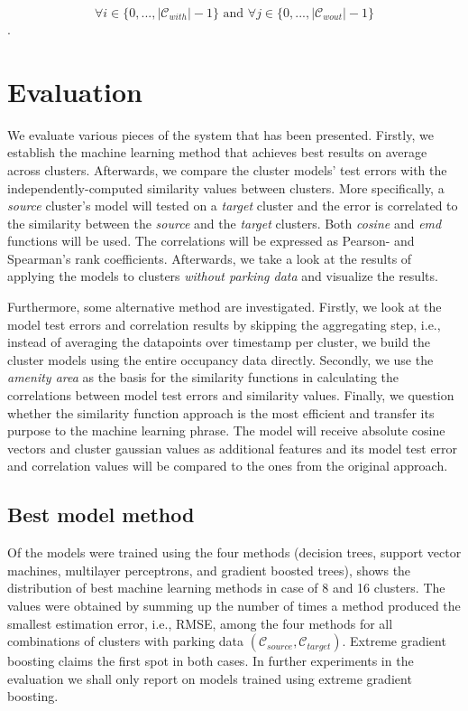 	$$\forall i \in \{0,...,|\mathcal{C}_{with}|-1\} \text{ and } \forall j \in \{0,...,|\mathcal{C}_{wout}|-1\}$$.
		
	\section{Evaluation}
	We evaluate various pieces of the system that has been presented. Firstly, we  establish the machine learning method that achieves best results on average across clusters. Afterwards, we compare the cluster models' test errors with the independently-computed similarity values between clusters. More specifically, a \textit{source} cluster's model will tested on a \textit{target} cluster and the error is correlated to the similarity between the \textit{source} and the \textit{target} clusters. Both \textit{cosine} and \textit{emd} functions will be used. The correlations will be expressed as Pearson- and Spearman's rank coefficients. Afterwards, we take a look at the results of applying the models to clusters \textit{without parking data} and visualize the results. 
	
	Furthermore, some alternative method are investigated. Firstly, we look at the model test errors and correlation results by skipping the aggregating step, i.e., instead of averaging the datapoints over timestamp per cluster, we build the cluster models using the entire occupancy data directly. Secondly, we use the \textit{amenity area} as the basis for the similarity functions in calculating the correlations between model test errors and similarity values. Finally, we question whether the similarity function approach is the most efficient and transfer its purpose to the machine learning phrase. The model will receive absolute cosine vectors and cluster gaussian values as additional features and its model test error and correlation values will be compared to the ones from the original approach.
	
	\subsection{Best model method}
	\label{sec:bestmodel}
	Of the models were trained using the four methods (decision trees, support vector machines, multilayer perceptrons, and gradient boosted trees),  shows the distribution of best machine learning methods in case of 8 and 16 clusters. The values were obtained by summing up the number of times a method produced the smallest estimation error, i.e., RMSE, among the four methods for all combinations of clusters with parking data $(\mathcal{C}_{source}, \mathcal{C}_{target})$.
	Extreme gradient boosting claims the first spot in both cases.
	In further experiments in the evaluation we shall only report on models trained using extreme gradient boosting.
	
